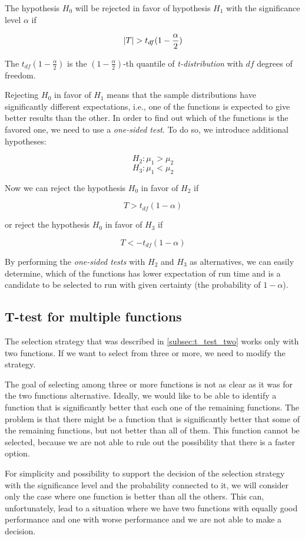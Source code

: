 The hypothesis $H_0$ will be rejected in favor of hypothesis $H_1$ with the significance level $\alpha$ if

\[\left|{T}\right| > t_{df}(1-\frac{\alpha}{2})\]

The $t_{df}(1-\frac{\alpha}{2})$ is the $(1-\frac{\alpha}{2})$-th quantile of \textit{t-distribution} with $df$ degrees of freedom.

Rejecting $H_0$ in favor of $H_1$ means that the sample distributions have significantly different expectations, i.e., one of the functions is expected to give better results than the other. In order to find out which of the functions is the favored one, we need to use a \textit{one-sided test}. To do so, we introduce additional hypotheses:

\[
H_2: \mu_1 > \mu_2
\]
\[
H_3: \mu_1 < \mu_2
\]

Now we can reject the hypothesis $H_0$ in favor of $H_2$ if

\[T > t_{df}(1-\alpha)\]

or reject the hypothesis $H_0$ in favor of $H_3$ if

\[T < -t_{df}(1-\alpha)\]

By performing the \textit{one-sided tests} with $H_2$ and $H_3$ as alternatives, we can easily determine, which of the functions has lower expectation of run time and is a candidate to be selected to run with given certainty (the probability of $1-\alpha$).

\subsection{T-test for multiple functions}
\label{subsec:t_test_multiple}

The selection strategy that was described in \ref{subsec:t_test_two} works only with two functions. If we want to select from three or more, we need to modify the strategy.

The goal of selecting among three or more functions is not as clear as it was for the two functions alternative. Ideally, we would like to be able to identify a function that is significantly better that each one of the remaining functions. The problem is that there might be a function that is significantly better that some of the remaining functions, but not better than all of them. This function cannot be selected, because we are not able to rule out the 
possibility that there is a faster option.

For simplicity and possibility to support the decision of the selection strategy with the significance level and the probability connected to it, we will consider only the case where one function is better than all the others. This can, unfortunately, lead to a situation where we have two functions with equally good performance and one with worse performance and we are not able to make a decision.

